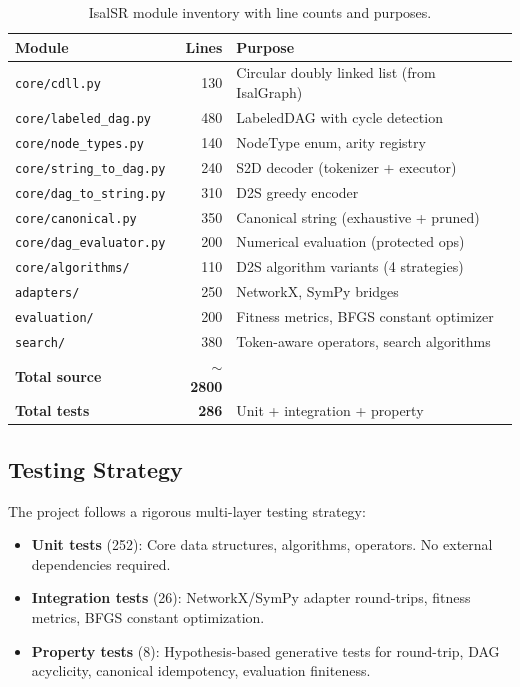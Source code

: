 \begin{table}[h]
\centering
\caption{IsalSR module inventory with line counts and purposes.}
\label{tab:modules}
\begin{tabular}{lrl}
\toprule
Module & Lines & Purpose \\
\midrule
\texttt{core/cdll.py} & 130 & Circular doubly linked list (from IsalGraph) \\
\texttt{core/labeled\_dag.py} & 480 & LabeledDAG with cycle detection \\
\texttt{core/node\_types.py} & 140 & NodeType enum, arity registry \\
\texttt{core/string\_to\_dag.py} & 240 & S2D decoder (tokenizer + executor) \\
\texttt{core/dag\_to\_string.py} & 310 & D2S greedy encoder \\
\texttt{core/canonical.py} & 350 & Canonical string (exhaustive + pruned) \\
\texttt{core/dag\_evaluator.py} & 200 & Numerical evaluation (protected ops) \\
\texttt{core/algorithms/} & 110 & D2S algorithm variants (4 strategies) \\
\midrule
\texttt{adapters/} & 250 & NetworkX, SymPy bridges \\
\texttt{evaluation/} & 200 & Fitness metrics, BFGS constant optimizer \\
\texttt{search/} & 380 & Token-aware operators, search algorithms \\
\midrule
\textbf{Total source} & \textbf{$\sim$2800} & \\
\textbf{Total tests} & \textbf{286} & Unit + integration + property \\
\bottomrule
\end{tabular}
\end{table}

\subsection{Testing Strategy}

The project follows a rigorous multi-layer testing strategy:
\begin{itemize}[nosep]
  \item \textbf{Unit tests} (252): Core data structures, algorithms, operators.
    No external dependencies required.
  \item \textbf{Integration tests} (26): NetworkX/SymPy adapter round-trips,
    fitness metrics, BFGS constant optimization.
  \item \textbf{Property tests} (8): Hypothesis-based generative tests for
    round-trip, DAG acyclicity, canonical idempotency, evaluation finiteness.
\end{itemize}

